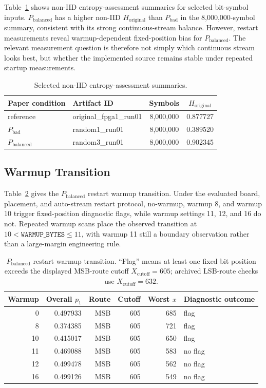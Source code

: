\documentclass[journal]{IEEEtran}
\newcommand{\pbad}{$P_\mathrm{bad}$}
\newcommand{\pbal}{$P_\mathrm{balanced}$}
\begin{document}
Table~\ref{tab:sp800summary} shows non-IID entropy-assessment summaries for selected bit-symbol inputs. \pbal{} has a higher non-IID $H_\mathrm{original}$ than \pbad{} in the 8,000,000-symbol summary, consistent with its strong continuous-stream balance. However, restart measurements reveal warmup-dependent fixed-position bias for \pbal{}. The relevant measurement question is therefore not simply which continuous stream looks best, but whether the implemented source remains stable under repeated startup measurements.

\begin{table}[t]
\centering
\caption{Selected non-IID entropy-assessment summaries.}
\label{tab:sp800summary}
\scriptsize
\begin{tabular}{llcc}
\toprule
Paper condition & Artifact ID & Symbols & $H_\mathrm{original}$ \\
\midrule
reference & original\_fpga1\_run01 & 8,000,000 & 0.877727 \\
\pbad{} & random1\_run01 & 8,000,000 & 0.389520 \\
\pbal{} & random3\_run01 & 8,000,000 & 0.902345 \\
\bottomrule
\end{tabular}
\end{table}

\subsection{Warmup Transition}

Table~\ref{tab:warmup} gives the \pbal{} restart warmup transition. Under the evaluated board, placement, and auto-stream restart protocol, no-warmup, warmup 8, and warmup 10 trigger fixed-position diagnostic flags, while warmup settings 11, 12, and 16 do not. Repeated warmup scans place the observed transition at $10 < \texttt{WARMUP\_BYTES} \le 11$, with warmup 11 still a boundary observation rather than a large-margin engineering rule.

\begin{table}[t]
\centering
\caption{\pbal{} restart warmup transition. ``Flag'' means at least one fixed bit position exceeds the displayed MSB-route cutoff $X_\mathrm{cutoff}=605$; archived LSB-route checks use $X_\mathrm{cutoff}=632$.}
\label{tab:warmup}
\scriptsize
\begin{tabular}{rrrrrl}
\toprule
Warmup & Overall $p_1$ & Route & Cutoff & Worst $x$ & Diagnostic outcome \\
\midrule
0  & 0.497933 & MSB & 605 & 685 & flag \\
8  & 0.374385 & MSB & 605 & 721 & flag \\
10 & 0.415017 & MSB & 605 & 650 & flag \\
11 & 0.469088 & MSB & 605 & 583 & no flag \\
12 & 0.499478 & MSB & 605 & 562 & no flag \\
16 & 0.499126 & MSB & 605 & 549 & no flag \\
\bottomrule
\end{tabular}
\end{table}
\end{document}
